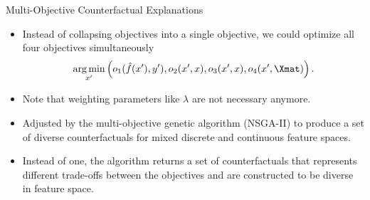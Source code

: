 \documentclass[aspectratio=169]{../latex_main/tntbeamer}  %
\begin{document}
\begin{frame}{Multi-Objective Counterfactual Explanations }
	\begin{itemize}
		\item Instead of collapsing objectives into a single objective, we could optimize all four objectives simultaneously
	$$	\argmin_{x'} \left(o_1(\hat{f}(x'), y'), o_2(x', x), o_3(x', x), o_4(x', \Xmat) \right). $$
		
		\item Note that weighting parameters like $\lambda$ are not necessary anymore. 
		\item Adjusted by the multi-objective genetic algorithm (NSGA-II) to produce a set of diverse counterfactuals for mixed discrete and continuous feature spaces.
		\item Instead of one, the algorithm returns a set of counterfactuals that represents different trade-offs between the objectives and are constructed to be diverse in feature space.
	\end{itemize}
\end{frame}
\end{document}
